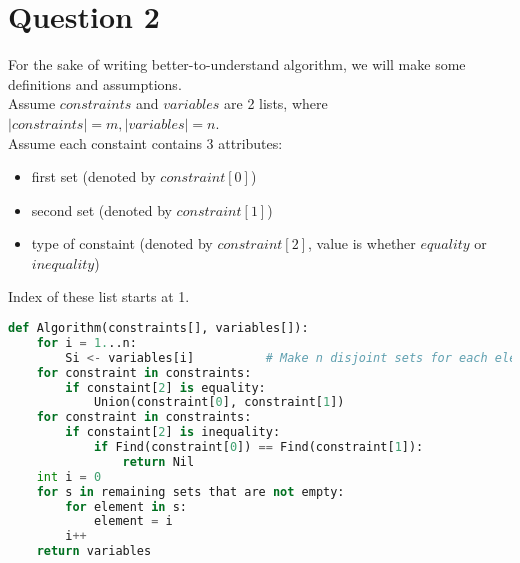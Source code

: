 \documentclass[10pt]{article}
\begin{document}
\section*{Question 2}
For the sake of writing better-to-understand algorithm, we will make some definitions and assumptions.\\
Assume $constraints$ and $variables$ are 2 lists, where $|constraints|=m, |variables|=n$.\\
Assume each constaint contains 3 attributes: 
\begin{itemize}
\item first set (denoted by $constraint[0]$)
\item second set (denoted by $constraint[1]$)
\item type of constaint (denoted by $constraint[2]$, value is whether $equality$ or $inequality$)
\end{itemize}
Index of these list starts at 1.
\begin{lstlisting}[language=Python]
def Algorithm(constraints[], variables[]):
	for i = 1...n:
		Si <- variables[i]			# Make n disjoint sets for each element of variables named S1...Sn
	for constraint in constraints:
		if constaint[2] is equality:
			Union(constraint[0], constraint[1])
	for constraint in constraints:
		if constaint[2] is inequality:
			if Find(constraint[0]) == Find(constraint[1]):
				return Nil
	int i = 0
	for s in remaining sets that are not empty:
		for element in s:
			element = i		
		i++
	return variables
	
\end{lstlisting}
\end{document}
